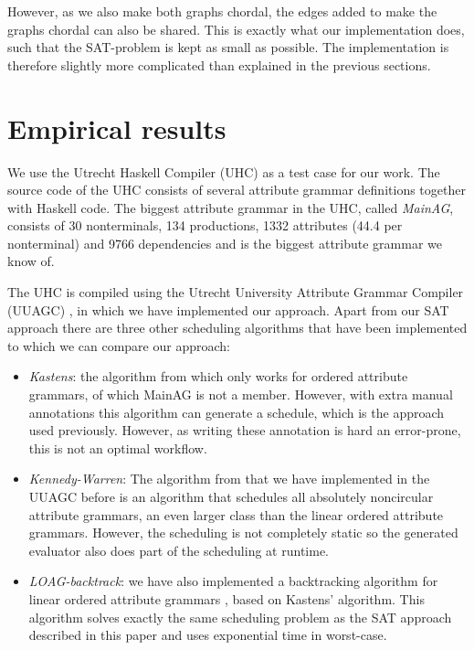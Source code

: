 \documentclass{llncs}
\begin{document}
However, as we also make both graphs chordal, the edges added to make the graphs chordal can also be shared. This is exactly what our implementation does, such that the SAT-problem is kept as small as possible. The implementation is therefore slightly more complicated than explained in the previous sections.

\section{Empirical results} \label{sect:results}
We use the Utrecht Haskell Compiler (UHC) \cite{Dijkstra:2009} as a test case for our work. The source code of the UHC consists of several attribute grammar definitions together with Haskell code. The biggest attribute grammar in the UHC, called \emph{MainAG}, consists of 30 nonterminals, 134 productions, 1332 attributes (44.4 per nonterminal) and 9766 dependencies and is the biggest attribute grammar we know of.

The UHC is compiled using the Utrecht University Attribute Grammar Compiler (UUAGC) \cite{combinator-languages}, in which we have implemented our approach. Apart from our SAT approach there are three other scheduling algorithms that have been implemented to which we can compare our approach:

\begin{itemize}
\item \emph{Kastens}: the algorithm from \cite{kastens80} which only works for ordered attribute grammars, of which MainAG is not a member. However, with extra manual annotations this algorithm can generate a schedule, which is the approach used previously. However, as writing these annotation is hard an error-prone, this is not an optimal workflow.
\item \emph{Kennedy-Warren}: The algorithm from \cite{kennedywarren76} that we have implemented in the UUAGC before \cite{bransen2012} is an algorithm that schedules all absolutely noncircular attribute grammars, an even larger class than the linear ordered attribute grammars. However, the scheduling is not completely static so the generated evaluator also does part of the scheduling at runtime. 
\item \emph{LOAG-backtrack}: we have also implemented a backtracking algorithm for linear ordered attribute grammars \cite{Binsbergen:2015}, based on Kastens' algorithm. This algorithm solves exactly the same scheduling problem as the SAT approach described in this paper and uses exponential time in worst-case.
\end{itemize} 
\end{document}
